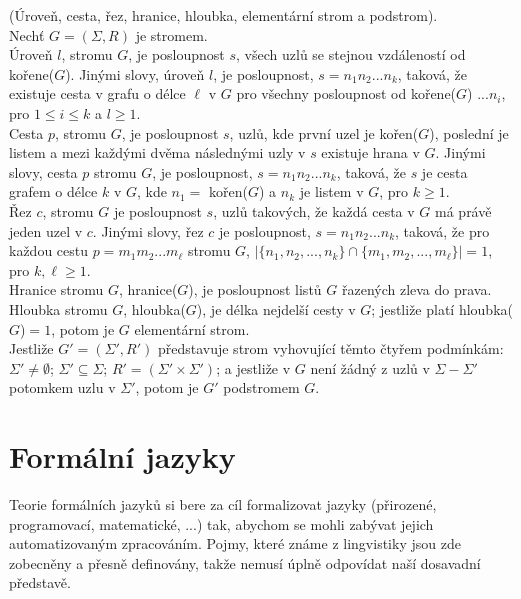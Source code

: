 \begin{defn}
  (Úroveň, cesta, řez, hranice, hloubka, elementární strom a podstrom). \cite[str. 12]{Koutny}\\
  Nechť $G = (\Sigma, R)$ je stromem.\\
  \indent
  Úroveň $l$, stromu $G$, je posloupnost $s$,
  všech uzlů se stejnou vzdáleností od kořene($G$).
  Jinými slovy, úroveň $l$, je posloupnost, $s = n_1 n_2 ... n_k$,
  taková, že existuje cesta v grafu o délce $\ell$ v $G$
  pro všechny posloupnost od kořene($G$)
  $ ... n_i$, pro $1 \leq i \leq k$ a $l \geq 1$.\\
  \indent
  Cesta $p$, stromu $G$, je posloupnost $s$, uzlů,
  kde první uzel je kořen($G$), poslední je listem a mezi každými
  dvěma následnými uzly v $s$ existuje hrana v $G$.
  Jinými slovy, cesta $p$ stromu $G$, je posloupnost,
  $s = n_1 n_2 ... n_k$, taková, že $s$ je cesta grafem
  o délce $k$ v $G$, kde $n_1 =$ kořen($G$) a $n_k$ je listem
  v $G$, pro $k \geq 1$.\\
  \indent
  Řez $c$, stromu $G$ je posloupnost $s$, uzlů takových,
  že každá cesta v $G$ má právě jeden uzel v $c$.
  Jinými slovy, řez $c$ je posloupnost, $s = n_1 n_2 ... n_k$,
  taková, že pro každou cestu $p = m_1 m_2 ... m_\ell$ stromu $G$,
  $|\{n_1, n_2, ..., n_k\} \cap \{m_1, m_2, ..., m_\ell\}| = 1$,
  pro $k, \ell \geq 1$.\\
  \indent
  Hranice stromu $G$, hranice($G$),
  je posloupnost listů $G$ řazených zleva do prava.\\
  \indent
  Hloubka stromu $G$, hloubka($G$), je délka nejdelší cesty v $G$;
  jestliže platí hloubka($G$)$ = 1$, potom je $G$ elementární strom.\\
  \indent
  Jestliže $G' = (\Sigma', R')$ představuje strom vyhovující těmto
  čtyřem podmínkám:
  $\Sigma' \neq \emptyset$;
  $\Sigma' \subseteq \Sigma$;
  $R' = (\Sigma' \times \Sigma')$;
  a jestliže v $G$ není žádný z uzlů v $\Sigma - \Sigma'$ potomkem
  uzlu v $\Sigma'$, potom je $G'$ podstromem $G$.
\end{defn}

\chapter{Formální jazyky}

Teorie formálních jazyků si bere za cíl formalizovat jazyky
(přirozené, programovací, matematické, ...) tak, abychom se mohli zabývat jejich
automatizovaným zpracováním.
Pojmy, které známe z lingvistiky jsou zde zobecněny a přesně definovány,
takže nemusí úplně odpovídat naší dosavadní představě.

